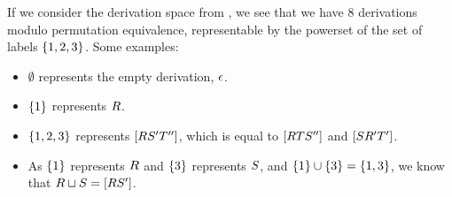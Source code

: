 \begin{example}
If we consider the derivation space from ,
we see that we have 8 derivations modulo permutation equivalence,
representable by the powerset of the set of labels $\{1, 2, 3\}$.
Some examples:
\begin{itemize}
  \item $\emptyset$ represents the empty derivation, $\epsilon$.
  \item $\{1\}$ represents $R$.
  \item $\{1, 2, 3\}$ represents $[R S' T'']$,
    which is equal to $[R T S'']$ and $[S R' T']$.
  \item As $\{1\}$ represents $R$ and $\{3\}$ represents $S$, and $\{1\} \cup \{3\} = \{1, 3\}$, we know that $R \sqcup S = [R S']$.
\end{itemize}
\end{example}

